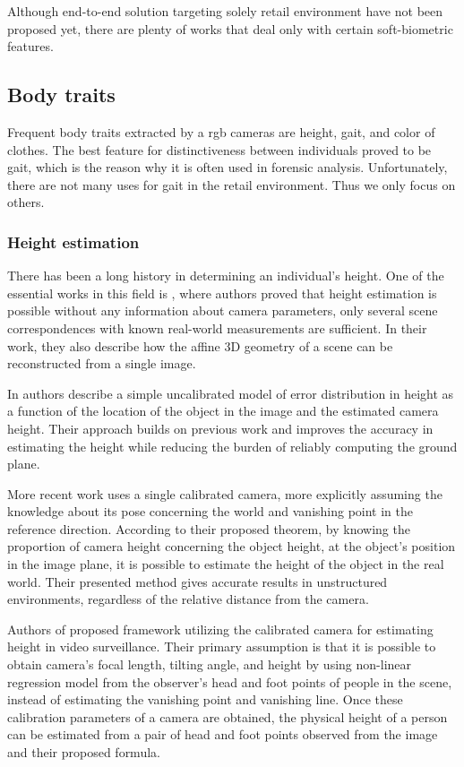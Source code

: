     Although end-to-end solution targeting solely retail environment have not been proposed yet, there are plenty of works that deal only with certain soft-biometric features.
   
    \subsection{Body traits}
        Frequent body traits extracted by a \gls{rgb} cameras are height, gait, and color of clothes. The best feature for distinctiveness between individuals proved to be gait, which is the reason why it is often used in forensic analysis. Unfortunately, there are not many uses for gait in the retail environment. Thus we only focus on others.
        
        \subsubsection{Height estimation}
            There has been a long history in determining an individual's height. One of the essential works in this field is \cite{criminisi2002single}, where authors proved that height estimation is possible without any information about camera parameters, only several scene correspondences with known real-world measurements are sufficient. In their work, they also describe how the affine 3D geometry of a scene can be reconstructed from a single image.
            
            In \cite{viswanath2009simplified} authors describe a simple uncalibrated model of error distribution in height as a function of the location of the object in the image and the estimated camera height. Their approach builds on previous work \cite{criminisi2002single} and improves the accuracy in estimating the height while reducing the burden of reliably computing the ground plane. 
        
            More recent work \cite{momeni2012height} uses a single calibrated camera, more explicitly assuming the knowledge about its pose concerning the world and vanishing point in the reference direction. According to their proposed theorem, by knowing the proportion of camera height concerning the object height, at the object’s position in the image plane, it is possible to estimate the height of the object in the real world. Their presented method gives accurate results in unstructured environments, regardless of the relative distance from the camera.
            
            Authors of \cite{li2015simplified} proposed framework utilizing the calibrated camera for estimating height in video surveillance. Their primary assumption is that it is possible to obtain camera's focal length, tilting angle, and height by using non-linear regression model from the observer's head and foot points of people in the scene, instead of estimating the vanishing point and vanishing line. Once these calibration parameters of a camera are obtained, the physical height of a person can be estimated from a pair of head and foot points observed from the image and their proposed formula.

